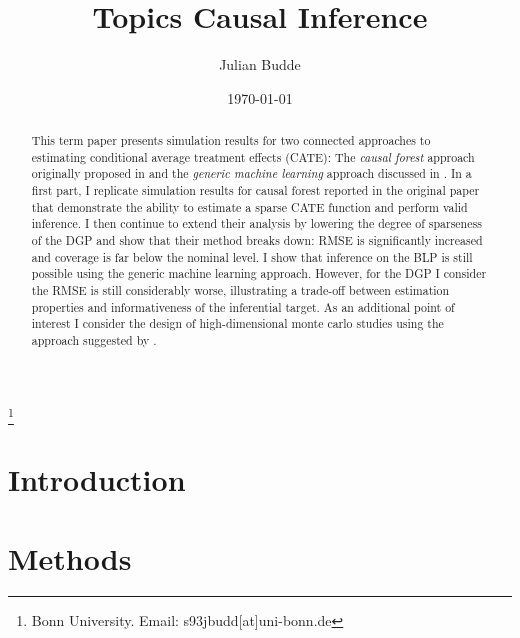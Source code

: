 \documentclass[11pt, a4paper, leqno]{article}
\begin{document}
\title{Topics Causal Inference}
\thanks{Bonn University. Email: s93jbudd[at]uni-bonn.de}

\author{Julian Budde}

\date{
    \today
}

\maketitle

\begin{abstract}
    This term paper presents simulation results for two connected approaches to estimating conditional average treatment effects (CATE):
    The \textit{causal forest} approach originally proposed in \cite{wager2018estimation} and the \textit{generic machine learning} approach discussed in \cite{chernozhukov2023genml}.
    In a first part, I replicate simulation results for causal forest reported in the original paper that demonstrate the ability to estimate a sparse CATE function and perform valid inference.
    I then continue to extend their analysis by lowering the degree of sparseness of the DGP and show that their method breaks down: RMSE is significantly increased and coverage is far below the nominal level.
    I show that inference on the BLP is still possible using the generic machine learning approach. However, for the DGP I consider the RMSE is still considerably worse, illustrating a trade-off between estimation properties and informativeness of the inferential target.
    As an additional point of interest I consider the design of high-dimensional monte carlo studies using the approach suggested by \cite{athey2024wgan}.
\end{abstract}

\clearpage

\section{Introduction}

\section{Methods}
\end{document}
